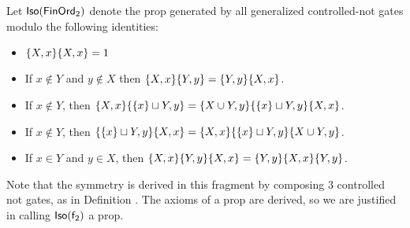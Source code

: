 \begin{conjecture}

Let  ${\sf Iso}(\mathsf{FinOrd}_2)$ denote the prop generated by all generalized controlled-not gates modulo the following identities:

\begin{itemize}
\item $\{ X,x\} \{ X,x \}= 1$ 


\item
If  $x \notin Y $ and $ y \notin X$ then $\{ X,x\} \{ Y,y\} =\{ Y,y\} \{ X,x\} $.


%

\item
If $x \notin Y$, then $\{ X,x\} \{ \{x\} \sqcup Y, y\} = \{ X\cup Y,y\}  \{ \{x\} \sqcup Y, y\}  \{ X,x\} $.

\item
If $x \notin Y$, then $ \{ \{x\} \sqcup Y, y\} \{ X,x\} = \{ X,x\}   \{ \{x\} \sqcup Y, y\}  \{ X\cup Y,y\} $.



\item
If $x \in Y$ and $y \in X$, then
$
\{  X,x \}  \{  Y,y \}   \{  X,x \} 
=
\{  Y,y \}  \{  X,x \}   \{  Y,y \} 
$.



\end{itemize}

\end{conjecture}



Note that the symmetry is derived in this fragment by composing 3 controlled not gates, as in Definition \label{def:isoaff}.  The axioms of a prop are derived, so we are justified in calling ${\sf Iso}(\mathsf{f}_2)$ a prop.


